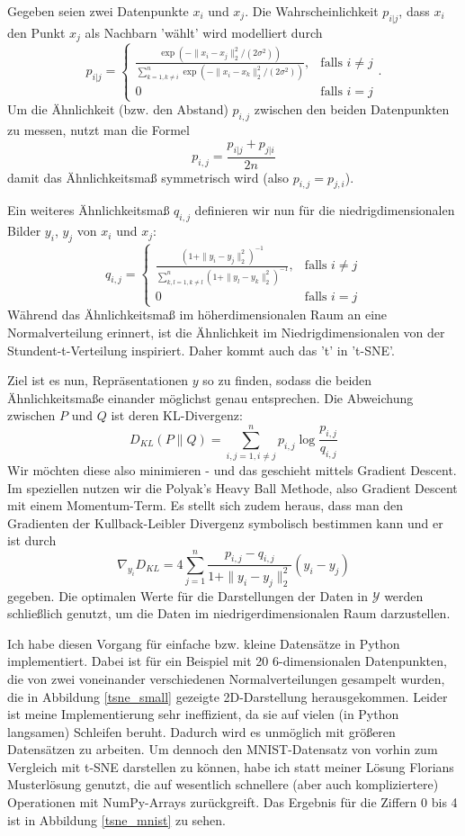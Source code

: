 \documentclass{article}
\begin{document}
Gegeben seien zwei Datenpunkte \(x_i\) und \(x_j\). Die Wahrscheinlichkeit \(p_{i|j}\), dass \(x_i\) den Punkt \(x_j\) als Nachbarn 'wählt' wird modelliert durch\[
p_{i|j}=\left\{ \begin{array}{cc}
    \frac{\exp(-\|x_i-x_j\|_2^2/(2\sigma^2))}{\sum_{k=1, k\neq i}^n\exp(-\|x_i-x_k\|_2^2/(2\sigma^2))}, &\text{falls } i\neq j \\
    0&\text {falls } i=j
    \end{array} \right..
\]Um die Ähnlichkeit (bzw. den Abstand) \(p_{i,j}\) zwischen den beiden Datenpunkten zu messen, nutzt man die Formel\[
p_{i,j}=\frac{p_{i|j}+p_{j|i}}{2n}
\]damit das Ähnlichkeitsmaß symmetrisch wird (also \(p_{i,j}=p_{j,i}\)).

Ein weiteres Ähnlichkeitsmaß \(q_{i,j}\) definieren wir nun für die niedrigdimensionalen Bilder \(y_i\), \(y_j\) von \(x_i\) und \(x_j\):\[
q_{i,j}=\left\{ \begin{array}{cc}
    \frac{(1+\|y_i-y_j\|_2^2)^{-1}}{\sum_{k,l=1, k\neq l}^n(1+\|y_l-y_k\|_2^2)^{-1}}, &\text{falls } i\neq j \\
    0&\text {falls } i=j
    \end{array} \right.
\]Während das Ähnlichkeitsmaß im höherdimensionalen Raum an eine Normalverteilung erinnert, ist die Ähnlichkeit im Niedrigdimensionalen von der Stundent-t-Verteilung inspiriert. Daher kommt auch das 't' in 't-SNE'.

Ziel ist es nun, Repräsentationen \(y\) so zu finden, sodass die beiden Ähnlichkeitsmaße einander möglichst genau entsprechen. Die Abweichung zwischen \(P\) und \(Q\) ist deren KL-Divergenz:\[
D_{KL}(P\|Q)=\sum_{i,j=1, i\neq j}^np_{i,j}\log\frac{p_{i,j}}{q_{i,j}}
\]Wir möchten diese also minimieren - und das geschieht mittels Gradient Descent. Im speziellen nutzen wir die Polyak's Heavy Ball Methode, also Gradient Descent mit einem Momentum-Term. Es stellt sich zudem heraus, dass man den Gradienten der Kullback-Leibler Divergenz symbolisch bestimmen kann und er ist durch\[
\nabla_{y_i}D_{KL}=4\sum_{j=1}^n\frac{p_{i,j}-q_{i,j}}{1+\|y_i-y_j\|^2_2}(y_i-y_j)
\]gegeben. Die optimalen Werte für die Darstellungen der Daten in \(\mathcal Y\) werden schließlich genutzt, um die Daten im niedrigerdimensionalen Raum darzustellen.

Ich habe diesen Vorgang für einfache bzw. kleine Datensätze in Python implementiert. Dabei ist für ein Beispiel mit 20 6-dimensionalen Datenpunkten, die von zwei voneinander verschiedenen Normalverteilungen gesampelt wurden, die in Abbildung \ref{tsne_small} gezeigte 2D-Darstellung herausgekommen. Leider ist meine Implementierung sehr ineffizient, da sie auf vielen (in Python langsamen) Schleifen beruht. Dadurch wird es unmöglich mit größeren Datensätzen zu arbeiten. Um dennoch den MNIST-Datensatz von vorhin zum Vergleich mit t-SNE darstellen zu können, habe ich statt meiner Lösung Florians Musterlösung genutzt, die auf wesentlich schnellere (aber auch kompliziertere) Operationen mit NumPy-Arrays zurückgreift. Das Ergebnis für die Ziffern 0 bis 4 ist in Abbildung \ref{tsne_mnist} zu sehen.
\end{document}

